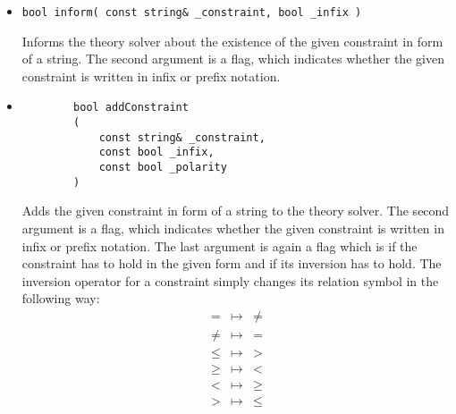 \begin{itemize}
	\item \begin{verbatim}bool inform( const string& _constraint, bool _infix )\end{verbatim}
		Informs the theory solver about the existence of the given constraint in form of
		a string. The second argument is a flag, which indicates whether the given constraint
		is written in infix or prefix notation.
	\item \begin{verbatim}
		bool addConstraint
		(
		    const string& _constraint,
		    const bool _infix,
		    const bool _polarity
		)
		\end{verbatim}
		Adds the given constraint in form of a string to the theory solver. The second argument 
		is a flag, which indicates whether the given constraint is written in infix or prefix 
		notation. The last argument is again a flag which is \true if the constraint
		has to hold in the given form and \false if its inversion has to hold. The inversion 
		operator for a constraint simply changes its relation symbol in the following way:
		$$\begin{array}{ccc}
			= & \mapsto & \neq \\
			\neq & \mapsto & = \\
			\leq & \mapsto & > \\
			\geq & \mapsto & < \\
			< & \mapsto & \geq \\
			> & \mapsto & \leq \\
		\end{array}$$\\[2ex]
		

\end{itemize}
